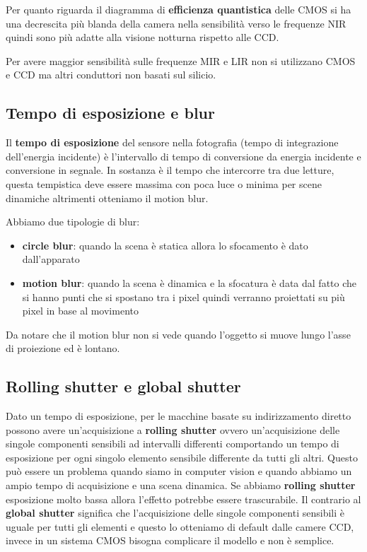 Per quanto riguarda il diagramma di \textbf{efficienza quantistica} delle CMOS si ha una 
decrescita più blanda della camera nella sensibilità verso le frequenze NIR quindi 
sono più adatte alla visione notturna rispetto alle CCD.

Per avere maggior sensibilità sulle frequenze MIR e LIR non si utilizzano 
CMOS e CCD ma altri conduttori non basati sul silicio.

\subsection{Tempo di esposizione e blur}
Il \textbf{tempo di esposizione} del sensore nella fotografia (tempo di integrazione 
dell'energia incidente) è l'intervallo di tempo di conversione da energia incidente 
e conversione in segnale. In sostanza è il tempo che intercorre tra due letture,
questa tempistica deve essere massima con poca luce o minima per scene dinamiche 
altrimenti otteniamo il motion blur.
\begin{nota}
    Abbiamo due tipologie di blur:
    \begin{itemize}
        \item \textbf{circle blur}: quando la scena è statica allora lo sfocamento 
        è dato dall'apparato
        \item \textbf{motion blur}: quando la scena è dinamica e la sfocatura è data 
        dal fatto che si hanno punti che si spostano tra i pixel quindi verranno proiettati 
        su più pixel in base al movimento
    \end{itemize}

    Da notare che il motion blur non si vede quando l'oggetto si muove lungo l'asse 
    di proiezione ed è lontano.
\end{nota}

\subsection{Rolling shutter e global shutter}
Dato un tempo di esposizione, per le macchine basate su indirizzamento diretto 
possono avere un'acquisizione a \textbf{rolling shutter} ovvero un'acquisizione 
delle singole componenti sensibili ad intervalli differenti comportando un tempo 
di esposizione per ogni singolo elemento sensibile differente da tutti gli altri.
Questo può essere un problema quando siamo in computer vision e quando abbiamo 
un ampio tempo di acquisizione e una scena dinamica. Se abbiamo \textbf{rolling shutter}
esposizione molto bassa allora l'effetto potrebbe essere trascurabile. 
Il contrario al \textbf{global shutter} significa che l'acquisizione delle singole 
componenti sensibili è uguale per tutti gli elementi e questo lo otteniamo di default dalle 
camere CCD, invece in un sistema CMOS bisogna complicare il modello e non è semplice. 

